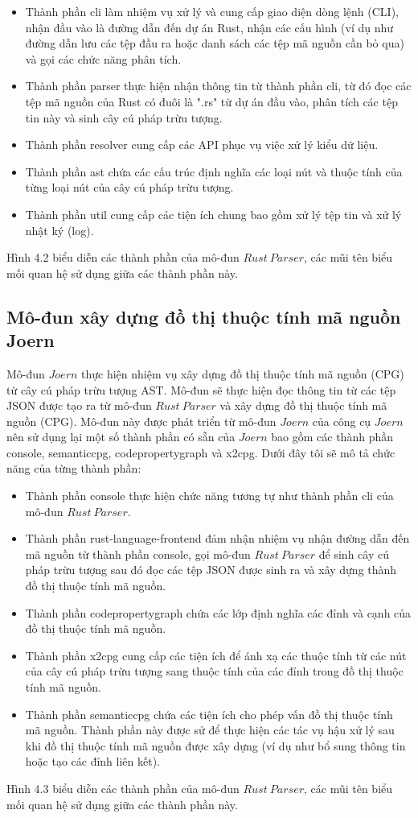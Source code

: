 \begin{itemize}
\item Thành phần cli làm nhiệm vụ xử lý và cung cấp giao diện dòng lệnh (CLI), nhận
đầu vào là đường dẫn đến dự án Rust, nhận các cấu hình (ví dụ như đường dẫn lưu
các tệp đầu ra hoặc danh sách các tệp mã nguồn cần bỏ qua) và gọi các chức năng
phân tích.
\item Thành phần parser thực hiện nhận thông tin từ thành phần cli, từ đó đọc các tệp mã
nguồn của Rust có đuôi là ".rs" từ dự án đầu vào, phân tích các tệp tin này và sinh
cây cú pháp trừu tượng.
\item Thành phần resolver cung cấp các API phục vụ việc xử lý kiểu dữ liệu.
\item Thành phần ast chứa các cấu trúc định nghĩa các loại nút và thuộc tính của từng
loại nút của cây cú pháp trừu tượng.
\item Thành phần util cung cấp các tiện ích chung bao gồm xử lý tệp tin và xử lý nhật ký
(log).
\end{itemize}
Hình 4.2 biểu diễn các thành phần của mô-đun $Rust\ Parser$, các mũi tên biểu mối
quan hệ sử dụng giữa các thành phần này.

\subsection{Mô-đun xây dựng đồ thị thuộc tính mã nguồn Joern}

Mô-đun $Joern$ thực hiện nhiệm vụ xây dựng đồ thị thuộc tính mã nguồn (CPG)
từ cây cú pháp trừu tượng AST. Mô-đun sẽ thực hiện đọc thông tin từ các tệp JSON được
tạo ra từ mô-đun $Rust\ Parser$ và xây dựng đồ thị thuộc tính mã nguồn (CPG). Mô-đun này
được phát triển từ mô-đun $Joern$ của công cụ $Joern$ nên sử dụng lại một số thành
phần có sẵn của $Joern$ bao gồm các thành phần console, semanticcpg, codepropertygraph
và x2cpg. Dưới đây tôi sẽ mô tả chức năng của từng thành phần:
\begin{itemize}
\item Thành phần console thực hiện chức năng tương tự như thành phần cli của mô-đun
$Rust\ Parser$.
\item Thành phần rust-language-frontend đảm nhận nhiệm vụ nhận đường dẫn đến mã nguồn từ thành phần console, gọi mô-đun $Rust\ Parser$ để sinh cây cú pháp trừu tượng sau đó đọc các tệp JSON được sinh ra và xây dựng thành đồ thị thuộc tính mã nguồn.
\item Thành phần codepropertygraph chứa các lớp định nghĩa các đỉnh và cạnh của đồ thị thuộc tính mã nguồn.
\item Thành phần x2cpg cung cấp các tiện ích để ánh xạ các thuộc tính từ các nút của cây cú pháp trừu tượng sang thuộc tính của các đỉnh trong đồ thị thuộc tính mã nguồn.
\item Thành phần semanticcpg chứa các tiện ích cho phép vấn đồ thị thuộc tính mã nguồn. Thành phần này được sử để thực hiện các tác vụ hậu xử lý sau khi đồ thị thuộc tính mã nguồn được xây dựng (ví dụ như bổ sung thông tin hoặc tạo các đỉnh liên kết).
\end{itemize}

Hình 4.3 biểu diễn các thành phần của mô-đun $Rust\ Parser$, các mũi tên biểu mối
quan hệ sử dụng giữa các thành phần này.

